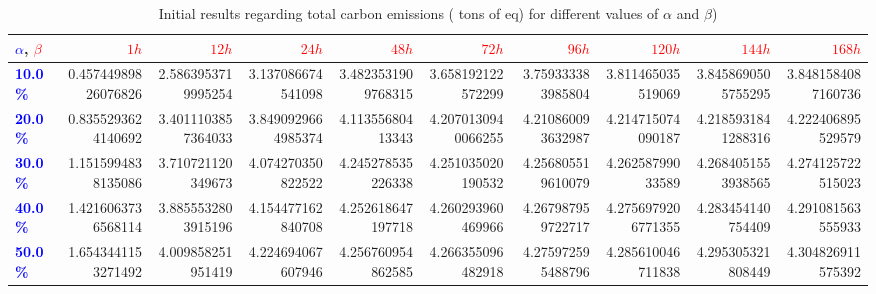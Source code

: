 \begin{table}[H]
\caption{Initial results regarding total carbon emissions ( tons of  eq) for different values of $\alpha$ and $\beta$)}\centering
\begin{tabular}{|l|r|r|r|r|r|r|r|r|r|}
\hline
\textcolor{blue}{$\alpha$}, \textcolor{red}{$\beta$} &   \textcolor{red}{\textbf{$ 1 h $}} &  \textcolor{red}{\textbf{$ 12 h $}} &  \textcolor{red}{\textbf{$ 24 h $}} &  \textcolor{red}{\textbf{$ 48 h $}} &   \textcolor{red}{\textbf{$ 72 h$}}  &   \textcolor{red}{\textbf{$ 96 h$}} &   \textcolor{red}{\textbf{$ 120 h $}} &   \textcolor{red}{\textbf{$ 144 h$}} &   \textcolor{red}{\textbf{$ 168 h$}} \\ 
     \hline
 \textcolor{blue}{ \textbf{10.0 \%}}   &  0.45744989826076826 &  2.5863953719995254 &  3.137086674541098 &  3.4823531909768315 &  3.658192122572299 &  3.759333383985804 &  3.811465035519069 &  3.8458690505755295 &  3.8481584087160736 \\ 
\hline
 \textcolor{blue}{ \textbf{20.0 \%}}   &  0.8355293624140692 &  3.4011103857364033 &  3.8490929664985374 &  4.11355680413343 &  4.2070130940066255 &  4.210860093632987 &  4.214715074090187 &  4.2185931841288316 &  4.222406895529579 \\ 
\hline
 \textcolor{blue}{ \textbf{30.0 \%}}   &  1.1515994838135086 &  3.710721120349673 &  4.074270350822522 &  4.245278535226338 &  4.251035020190532 &  4.256805519610079 &  4.26258799033589 &  4.2684051553938565 &  4.274125722515023 \\ 
\hline
 \textcolor{blue}{ \textbf{40.0 \%}}   &  1.4216063736568114 &  3.8855532803915196 &  4.154477162840708 &  4.252618647197718 &  4.260293960469966 &  4.267987959722717 &  4.2756979206771355 &  4.283454140754409 &  4.291081563555933 \\ 
\hline
 \textcolor{blue}{ \textbf{50.0 \%}}   &  1.6543441153271492 &  4.009858251951419 &  4.224694067607946 &  4.256760954862585 &  4.266355096482918 &  4.275972595488796 &  4.285610046711838 &  4.295305321808449 &  4.304826911575392 \\ 
\hline
\end{tabular}
\end{table}
